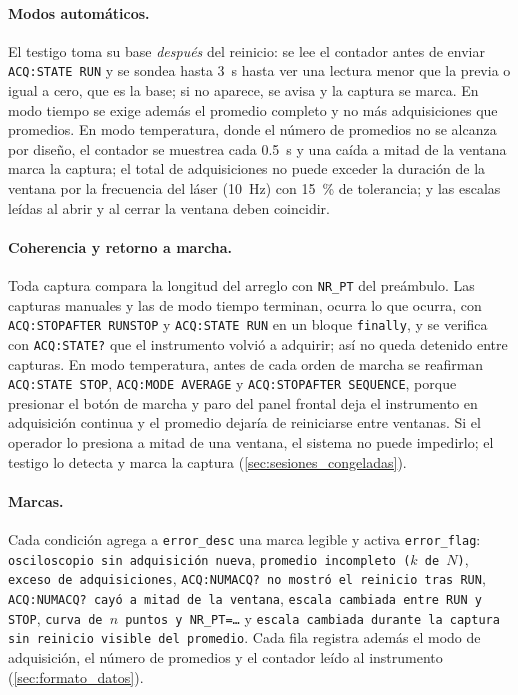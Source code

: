 \paragraph{Modos automáticos.} El testigo toma su base \emph{después}
del reinicio: se lee el contador antes de enviar \texttt{ACQ:STATE RUN}
y se sondea hasta \SI{3}{\second} hasta ver una lectura menor que la
previa o igual a cero, que es la base; si no aparece, se avisa y la
captura se marca. En modo tiempo se exige además el promedio completo y
no más adquisiciones que promedios. En modo temperatura, donde el número
de promedios no se alcanza por diseño, el contador se muestrea cada
\SI{0.5}{\second} y una caída a mitad de la ventana marca la captura; el
total de adquisiciones no puede exceder la duración de la ventana por la
frecuencia del láser (\SI{10}{\hertz}) con \SI{15}{\percent} de tolerancia; y las
escalas leídas al abrir y al cerrar la ventana deben coincidir.

\paragraph{Coherencia y retorno a marcha.} Toda captura compara la
longitud del arreglo con \texttt{NR\_PT} del preámbulo. Las capturas
manuales y las de modo tiempo terminan, ocurra lo que ocurra, con
\texttt{ACQ:STOPAFTER RUNSTOP} y \texttt{ACQ:STATE RUN} en un bloque
\texttt{finally}, y se verifica con \texttt{ACQ:STATE?} que el
instrumento volvió a adquirir; así no queda detenido entre capturas.
En modo temperatura, antes de cada orden de marcha se reafirman
\texttt{ACQ:STATE STOP}, \texttt{ACQ:MODE AVERAGE} y
\texttt{ACQ:STOPAFTER SEQUENCE}, porque presionar el botón de marcha y
paro del panel frontal deja el instrumento en adquisición continua y el
promedio dejaría de reiniciarse entre ventanas. Si el operador lo
presiona a mitad de una ventana, el sistema no puede impedirlo; el
testigo lo detecta y marca la captura
(\cref{sec:sesiones_congeladas}).

{\sloppy\paragraph{Marcas.} Cada condición agrega a \texttt{error\_desc} una
marca legible y activa \texttt{error\_flag}: \texttt{osciloscopio sin
adquisición nueva}, \texttt{promedio incompleto ($k$ de $N$)},
\texttt{exceso de adquisiciones}, \texttt{ACQ:NUMACQ? no mostró el
reinicio tras RUN}, \texttt{ACQ:NUMACQ? cayó a mitad de la ventana},
\texttt{escala cambiada entre RUN y STOP}, \texttt{curva de $n$ puntos y
NR\_PT=\ldots} y \texttt{escala cambiada durante la captura}
\texttt{sin reinicio visible del promedio}. Cada fila registra además el modo de
adquisición, el número de promedios y el contador leído al instrumento
(\cref{sec:formato_datos}).\par}

